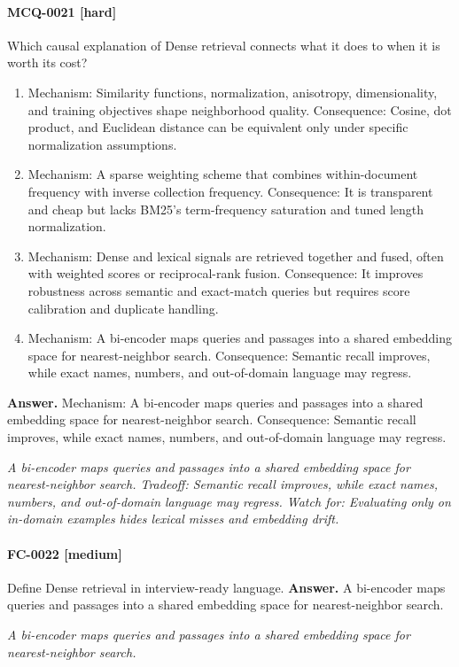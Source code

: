 \paragraph{MCQ-0021 [hard]} Which causal explanation of Dense retrieval connects what it does to when it is worth its cost?
\begin{enumerate}[label=\Alph*.]
\item Mechanism: Similarity functions, normalization, anisotropy, dimensionality, and training objectives shape neighborhood quality. Consequence: Cosine, dot product, and Euclidean distance can be equivalent only under specific normalization assumptions.
\item Mechanism: A sparse weighting scheme that combines within-document frequency with inverse collection frequency. Consequence: It is transparent and cheap but lacks BM25's term-frequency saturation and tuned length normalization.
\item Mechanism: Dense and lexical signals are retrieved together and fused, often with weighted scores or reciprocal-rank fusion. Consequence: It improves robustness across semantic and exact-match queries but requires score calibration and duplicate handling.
\item Mechanism: A bi-encoder maps queries and passages into a shared embedding space for nearest-neighbor search. Consequence: Semantic recall improves, while exact names, numbers, and out-of-domain language may regress.
\end{enumerate}
\noindent\textbf{Answer.} Mechanism: A bi-encoder maps queries and passages into a shared embedding space for nearest-neighbor search. Consequence: Semantic recall improves, while exact names, numbers, and out-of-domain language may regress.
\par\textit{A bi-encoder maps queries and passages into a shared embedding space for nearest-neighbor search. Tradeoff: Semantic recall improves, while exact names, numbers, and out-of-domain language may regress. Watch for: Evaluating only on in-domain examples hides lexical misses and embedding drift.}
\paragraph{FC-0022 [medium]} Define Dense retrieval in interview-ready language.
\noindent\textbf{Answer.} A bi-encoder maps queries and passages into a shared embedding space for nearest-neighbor search.
\par\textit{A bi-encoder maps queries and passages into a shared embedding space for nearest-neighbor search.}
